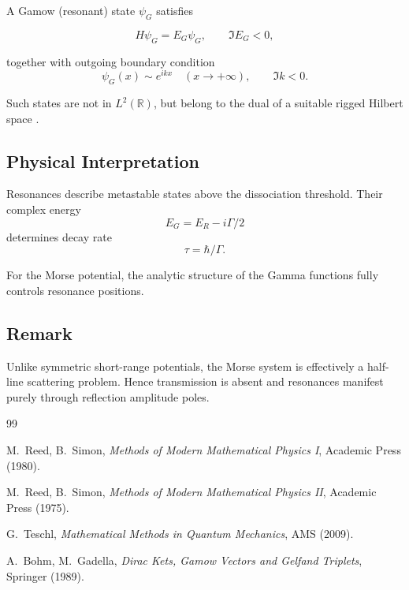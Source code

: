 \documentclass[11pt]{article}
\begin{document}
A Gamow (resonant) state $\psi_G$ satisfies

\begin{equation}
H\psi_G = E_G \psi_G,
\qquad
\Im E_G<0,
\end{equation}

together with outgoing boundary condition
\[
\psi_G(x)\sim e^{ikx}
\quad (x\to+\infty),
\qquad \Im k<0.
\]

Such states are not in $L^2(\mathbb R)$,
but belong to the dual of a suitable
rigged Hilbert space
\cite{bohm-gadella}.

\subsection{Physical Interpretation}

Resonances describe metastable states above the
dissociation threshold.
Their complex energy
\[
E_G = E_R - i\Gamma/2
\]
determines decay rate
\[
\tau = \hbar/\Gamma.
\]

For the Morse potential,
the analytic structure of the Gamma functions
fully controls resonance positions.

\subsection*{Remark}

Unlike symmetric short-range potentials,
the Morse system is effectively a half-line scattering problem.
Hence transmission is absent and resonances manifest purely
through reflection amplitude poles.

\begin{thebibliography}{99}

M.~Reed, B.~Simon,
\textit{Methods of Modern Mathematical Physics I},
Academic Press (1980).

M.~Reed, B.~Simon,
\textit{Methods of Modern Mathematical Physics II},
Academic Press (1975).

G.~Teschl,
\textit{Mathematical Methods in Quantum Mechanics},
AMS (2009).

A.~Bohm, M.~Gadella,
\textit{Dirac Kets, Gamow Vectors and Gelfand Triplets},
Springer (1989).

\end{thebibliography}
\end{document}
